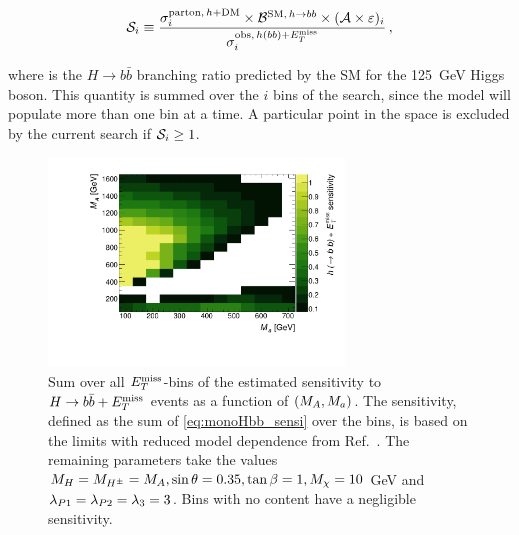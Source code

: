 \begin{equation}
\label{eq:monoHbb_sensi}
\mathcal{S}_i \equiv \frac{\sigma_{i}^{\mathrm{parton},\,h+\textrm{DM}} \times \mathcal{B}^{\mathrm{SM},\,h\to bb} \times (\mathcal{A\times\varepsilon})_{i} }
{\sigma_{i}^{\mathrm{obs},\,h(bb)+E_T^\mathrm{miss}}}\,,
\end{equation}

where  is the $H\rightarrow b\bar{b}$ branching ratio predicted by the SM for the 125~GeV Higgs boson. This quantity is summed over the $i$ \met bins of the search, since the model will populate more than one \met bin at a time. A particular point in the space is excluded by the current search if $\mathcal{S}_i \geq 1$. 

\begin{figure}[tbp]
\centering
\includegraphics[width=0.7\textwidth]{texinputs/04_grid/figures/monoHbb_sensi_sum_bins_1_2_3_4_ma_vs_mA_lin.pdf}
\caption[Sensitivity to $h\to bb + \MET$ signals in $\mA$ - $\ma$ plane, summed across $\MET$ bins]
{
Sum over all $\MET$-bins of the estimated sensitivity to $H\rightarrow b\bar{b} + E_T^\mathrm{miss}$ events as a function of $(M_{A},M_{a})$. 
The sensitivity, defined as the sum of \autoref{eq:monoHbb_sensi} over the \met bins, is based on the limits with reduced model dependence from Ref.~\cite{Aaboud:2017yqz}. 
The remaining parameters take the values $ M_{H}=M_{H^{\pm}}= M_{A}, \sin\theta = 0.35, \tan\beta = 1, M_{\chi} = 10$ GeV and $ \lambda_{P1} = \lambda_{P2} = \lambda_{3} = 3 $. Bins with no content have a negligible sensitivity.}
\label{fig:monoHbb_sensi_full_mA_ma}
\end{figure}

